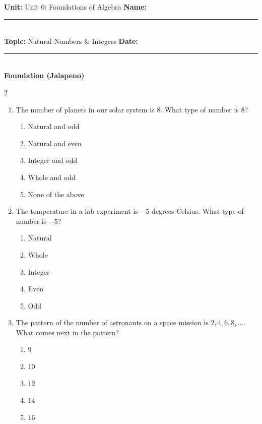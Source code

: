\documentclass[10pt]{article}
\begin{document}
\enlargethispage{2.5cm}

\begin{tcolorbox}[colback=mainblue!5, colframe=mainblue, sharp corners, boxrule=0.5pt]
    \small \textbf{Unit:} Unit 0: Foundations of Algebra \hfill \textbf{Name:} \rule{3cm}{0.4pt} \\
    \small \textbf{Topic:} Natural Numbers & Integers \hfill \textbf{Date:} \rule{2cm}{0.4pt} \\
    \centering \textbf{\large Foundation (Jalapeno)}
\end{tcolorbox}

\vspace{0.2cm}

\begin{multicols}{2}
\begin{enumerate}[label=\textbf{Q\arabic*.}, leftmargin=*, itemsep=6pt, parsep=0pt]

  \item \small The number of planets in our solar system is $8$. What type of number is $8$?
  \begin{enumerate}[label=(\Alph*), leftmargin=0.6cm, nosep, itemsep=2pt]
    \item Natural and odd
    \item Natural and even
    \item Integer and odd
    \item Whole and odd
    \item None of the above
  \end{enumerate}

  \item \small The temperature in a lab experiment is $-5$ degrees Celsius. What type of number is $-5$?
  \begin{enumerate}[label=(\Alph*), leftmargin=0.6cm, nosep, itemsep=2pt]
    \item Natural
    \item Whole
    \item Integer
    \item Even
    \item Odd
  \end{enumerate}

  \item \small The pattern of the number of astronauts on a space mission is $2, 4, 6, 8, ...$. What comes next in the pattern?
  \begin{enumerate}[label=(\Alph*), leftmargin=0.6cm, nosep, itemsep=2pt]
    \item $9$
    \item $10$
    \item $12$
    \item $14$
    \item $16$
  \end{enumerate}


\end{enumerate}
\end{multicols}
\end{document}
